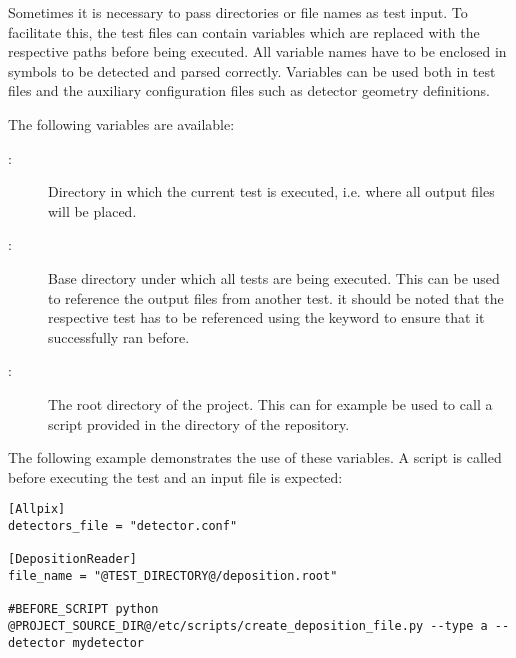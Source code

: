 Sometimes it is necessary to pass directories or file names as test input.
To facilitate this, the test files can contain variables which are replaced with the respective paths before being executed.
All variable names have to be enclosed in  symbols to be detected and parsed correctly.
Variables can be used both in test files and the auxiliary configuration files such as detector geometry definitions.

The following variables are available:

\begin{description}
  \item[:] Directory in which the current test is executed, i.e. where all output files will be placed.
  \item[:] Base directory under which all tests are being executed. This can be used to reference the output files from another test. it should be noted that the respective test has to be referenced using the  keyword to ensure that it successfully ran before.
  \item[:] The root directory of the project. This can for example be used to call a script provided in the  directory of the repository.
\end{description}

The following example demonstrates the use of these variables.
A script is called before executing the test and an input file is expected:

\begin{verbatim}
[Allpix]
detectors_file = "detector.conf"

[DepositionReader]
file_name = "@TEST_DIRECTORY@/deposition.root"

#BEFORE_SCRIPT python @PROJECT_SOURCE_DIR@/etc/scripts/create_deposition_file.py --type a --detector mydetector
\end{verbatim}
